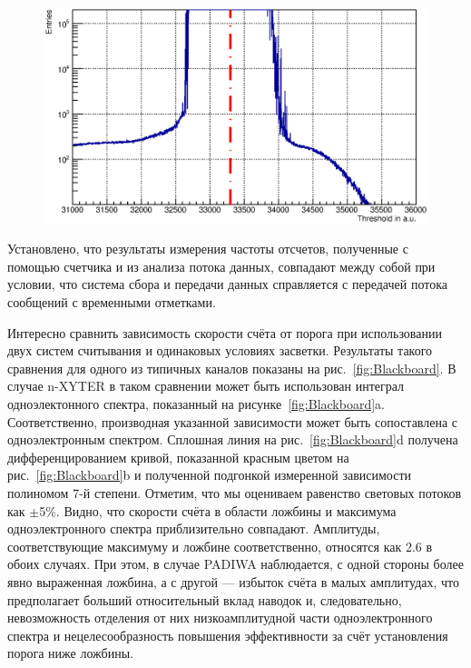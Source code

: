 

\begin{figure}
\includegraphics[width=1.0\textwidth]{pictures/cMean12.eps}
\caption{}
\label{fig:TDCscalerScan}
\end{figure}

Установлено, что результаты измерения частоты отсчетов, полученные с помощью счетчика и из анализа потока данных, совпадают между собой при условии, что система сбора и передачи данных справляется с передачей потока сообщений с временными отметками.

Интересно сравнить зависимость скорости счёта от порога при использовании двух систем считывания и одинаковых условиях засветки. Результаты такого сравнения для одного из типичных каналов показаны на рис.~\ref{fig:Blackboard}. В случае n-XYTER в таком сравнении может быть использован интеграл одноэлектонного спектра, показанный на рисунке~\ref{fig:Blackboard}a. Соответственно, производная указанной зависимости может быть сопоставлена с одноэлектронным спектром. Сплошная линия на рис.~\ref{fig:Blackboard}d получена дифференцированием кривой, показанной красным цветом на рис.~\ref{fig:Blackboard}b и полученной подгонкой измеренной зависимости полиномом 7-й степени. Отметим, что мы оцениваем равенство световых потоков как $ \pm $5\%. Видно, что скорости счёта в области ложбины и максимума одноэлектронного спектра приблизительно совпадают. Амплитуды, соответствующие максимуму и ложбине соответственно, относятся как 2.6 в обоих случаях. При этом, в случае PADIWA наблюдается, с одной стороны более явно выраженная ложбина, а с другой --- избыток счёта в малых амплитудах, что предполагает больший относительный вклад наводок и, следовательно, невозможность отделения от них низкоамплитудной части одноэлектронного спектра и нецелесообразность повышения эффективности за счёт установления порога ниже ложбины.

